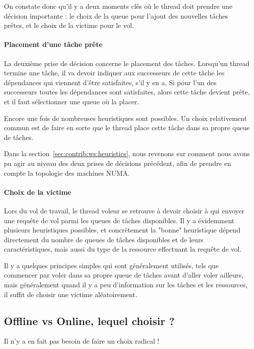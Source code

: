 On constate donc qu'il y a deux moments clés où le thread doit prendre une décision importante : le choix de la queue pour l'ajout des nouvelles tâches prêtes, et le choix de la victime pour le vol.

\paragraph{Placement d'une tâche prête}

La deuxième prise de décision concerne le placement des tâches.
Lorsqu'un thread termine une tâche, il va devoir indiquer aux successeurs de cette tâche les dépendances qui viennent d'être satisfaites, s'il y en a.
Si pour l'un des successeurs toutes les dépendances sont satisfaites, alors cette tâche devient prête, et il faut sélectionner une queue où la placer.

Encore une fois de nombreuses heuristiques sont possibles. Un choix relativement commun est de faire en sorte que le thread place cette tâche dans sa propre queue de tâches.


Dans la section~\ref{sec:contrib:ws:heuristics}, nous revenons sur comment nous avons pu agir au niveau des deux prises de décisions précédent, afin de prendre en compte la topologie des machines NUMA.

\paragraph{Choix de la victime}

Lors du vol de travail, le thread voleur se retrouve à devoir choisir à qui envoyer une requête de vol parmi les queues de tâches disponibles.
Il y a évidemment plusieurs heuristiques possibles, et concrètement la "bonne" heuristique dépend directement du nombre de queues de tâches disponibles et de leurs caractéristiques, mais aussi du type de la ressource effectuant la requête de vol.

Il y a quelques principes simples qui sont généralement utilisés, tels que commencer par voler dans sa propre queue de tâches avant d'aller voler ailleurs, mais généralement quand il y a peu d'information sur les tâches et les ressources, il suffit de choisir une victime aléatoirement.


\subsection{Offline vs Online, lequel choisir ?}

Il n'y a en fait pas besoin de faire un choix radical !

